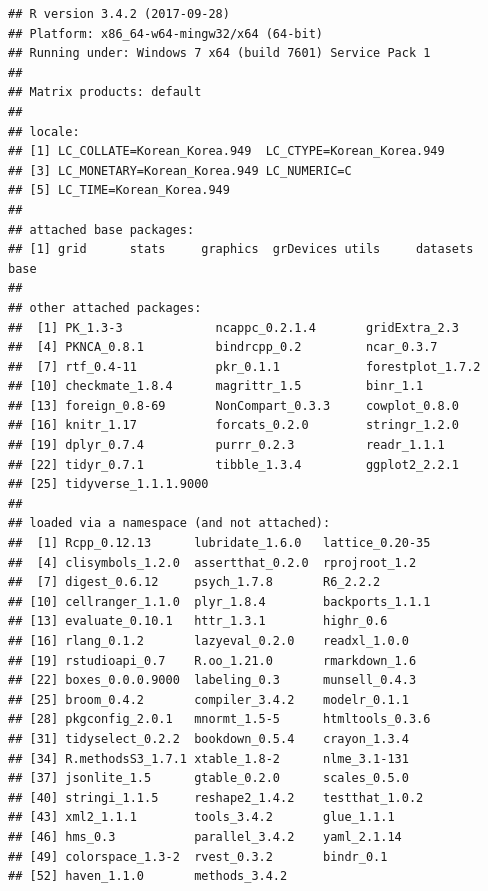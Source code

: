 \documentclass[]{krantz}
\theoremstyle{definition}
\theoremstyle{definition}
\theoremstyle{definition}
\theoremstyle{remark}
\begin{document}
\begin{verbatim}
## R version 3.4.2 (2017-09-28)
## Platform: x86_64-w64-mingw32/x64 (64-bit)
## Running under: Windows 7 x64 (build 7601) Service Pack 1
## 
## Matrix products: default
## 
## locale:
## [1] LC_COLLATE=Korean_Korea.949  LC_CTYPE=Korean_Korea.949   
## [3] LC_MONETARY=Korean_Korea.949 LC_NUMERIC=C                
## [5] LC_TIME=Korean_Korea.949    
## 
## attached base packages:
## [1] grid      stats     graphics  grDevices utils     datasets  base     
## 
## other attached packages:
##  [1] PK_1.3-3             ncappc_0.2.1.4       gridExtra_2.3       
##  [4] PKNCA_0.8.1          bindrcpp_0.2         ncar_0.3.7          
##  [7] rtf_0.4-11           pkr_0.1.1            forestplot_1.7.2    
## [10] checkmate_1.8.4      magrittr_1.5         binr_1.1            
## [13] foreign_0.8-69       NonCompart_0.3.3     cowplot_0.8.0       
## [16] knitr_1.17           forcats_0.2.0        stringr_1.2.0       
## [19] dplyr_0.7.4          purrr_0.2.3          readr_1.1.1         
## [22] tidyr_0.7.1          tibble_1.3.4         ggplot2_2.2.1       
## [25] tidyverse_1.1.1.9000
## 
## loaded via a namespace (and not attached):
##  [1] Rcpp_0.12.13      lubridate_1.6.0   lattice_0.20-35  
##  [4] clisymbols_1.2.0  assertthat_0.2.0  rprojroot_1.2    
##  [7] digest_0.6.12     psych_1.7.8       R6_2.2.2         
## [10] cellranger_1.1.0  plyr_1.8.4        backports_1.1.1  
## [13] evaluate_0.10.1   httr_1.3.1        highr_0.6        
## [16] rlang_0.1.2       lazyeval_0.2.0    readxl_1.0.0     
## [19] rstudioapi_0.7    R.oo_1.21.0       rmarkdown_1.6    
## [22] boxes_0.0.0.9000  labeling_0.3      munsell_0.4.3    
## [25] broom_0.4.2       compiler_3.4.2    modelr_0.1.1     
## [28] pkgconfig_2.0.1   mnormt_1.5-5      htmltools_0.3.6  
## [31] tidyselect_0.2.2  bookdown_0.5.4    crayon_1.3.4     
## [34] R.methodsS3_1.7.1 xtable_1.8-2      nlme_3.1-131     
## [37] jsonlite_1.5      gtable_0.2.0      scales_0.5.0     
## [40] stringi_1.1.5     reshape2_1.4.2    testthat_1.0.2   
## [43] xml2_1.1.1        tools_3.4.2       glue_1.1.1       
## [46] hms_0.3           parallel_3.4.2    yaml_2.1.14      
## [49] colorspace_1.3-2  rvest_0.3.2       bindr_0.1        
## [52] haven_1.1.0       methods_3.4.2
\end{verbatim}
\end{document}
